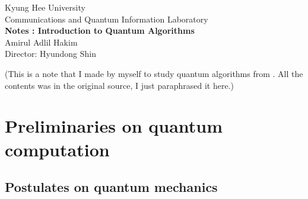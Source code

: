 \documentclass[11pt]{article}
\begin{document}
\begin{center}
Kyung Hee University\\
Communications and Quantum Information Laboratory\\[0.7cm]

{\LARGE \textbf{Notes : Introduction to Quantum Algorithms}}\\[0.7cm]
 Amirul Adlil Hakim\\ 
Director: Hyundong Shin\\[1cm]
\end{center}

(This is a note that I made by myself to study quantum algorithms from \cite{lin2022lecture}. All the contents was in the original source, I just paraphrased it here.)
\section{Preliminaries on quantum computation}
\subsection{Postulates on quantum mechanics}
\end{document}
